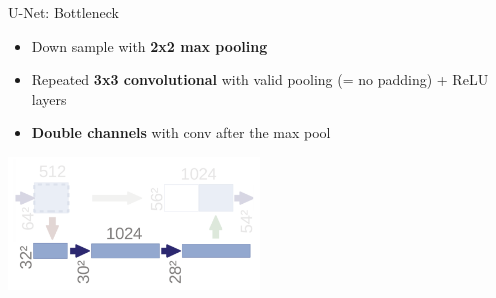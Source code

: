 \documentclass[serif, aspectratio=169]{beamer}
\begin{document}
\begin{frame}{U-Net: Bottleneck}
    \begin{itemize}
    \small
    \setlength\itemsep{1em} 
        \item Down sample with \textbf{2x2 max pooling}
        \item Repeated \textbf{3x3 convolutional} with \textcolor{red!60!black}{valid pooling} (= no padding) + ReLU layers
        \item \textbf{Double channels} with conv after the max pool
    \end{itemize}

    \begin{center}
        \includegraphics[width=0.5\textwidth]{pic/Unet Bottleneck.png}
    \end{center}
\end{frame}
\end{document}
